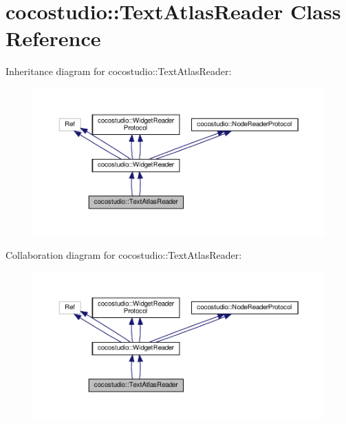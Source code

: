 \hypertarget{classcocostudio_1_1TextAtlasReader}{}\section{cocostudio\+:\+:Text\+Atlas\+Reader Class Reference}
\label{classcocostudio_1_1TextAtlasReader}


Inheritance diagram for cocostudio\+:\+:Text\+Atlas\+Reader\+:
\nopagebreak
\begin{figure}[H]
\begin{center}
\leavevmode
\includegraphics[width=350pt]{classcocostudio_1_1TextAtlasReader__inherit__graph}
\end{center}
\end{figure}


Collaboration diagram for cocostudio\+:\+:Text\+Atlas\+Reader\+:
\nopagebreak
\begin{figure}[H]
\begin{center}
\leavevmode
\includegraphics[width=350pt]{classcocostudio_1_1TextAtlasReader__coll__graph}
\end{center}
\end{figure}
